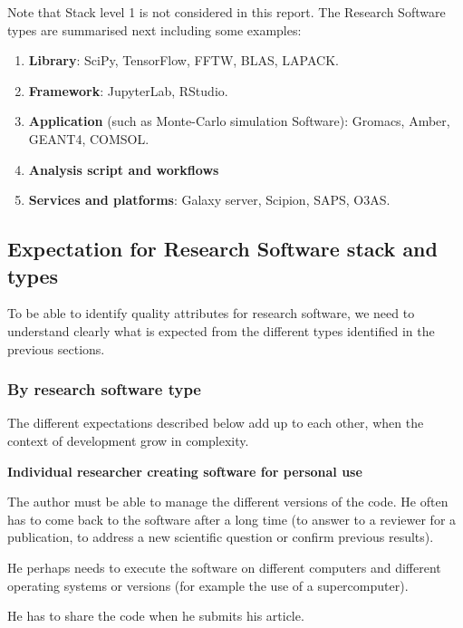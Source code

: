 Note that Stack level 1 is not considered in this report. The Research Software types are summarised next including some examples:

\begin{enumerate}
    \item \textbf{Library}: SciPy, TensorFlow, FFTW, BLAS, LAPACK.
    \item \textbf{Framework}: JupyterLab, RStudio.
    \item \textbf{Application} (such as Monte-Carlo simulation Software): Gromacs, Amber, GEANT4, COMSOL.
    \item \textbf{Analysis script and workflows}
    \item \textbf{Services and platforms}: Galaxy server, Scipion, SAPS, O3AS.
\end{enumerate}


\subsection{Expectation for Research Software stack and types}

To be able to identify quality attributes for research software, we need to understand clearly what is expected from the different types identified in the previous sections.

\subsubsection{By research software type}

The different expectations described below add up to each other, when the context of development grow in complexity.

\textbf{Individual researcher creating software for personal use}


The author must be able to manage the different versions of the code. He often has to come back to the software after a long time (to answer to a reviewer for a publication, to address a new scientific question or confirm previous results).

He perhaps needs to execute the software on different computers and different operating systems or versions (for example the use of a supercomputer).

He has to share the code when he submits his article.

